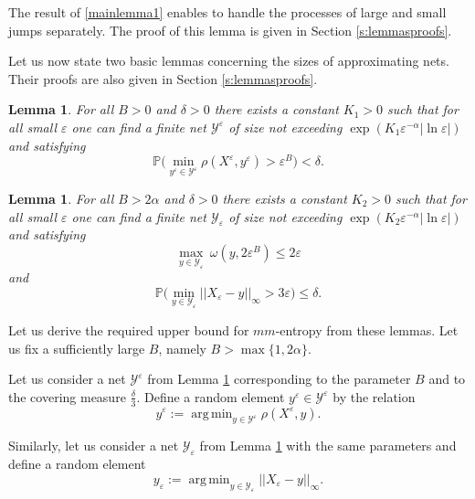 \documentclass[12pt]{article}
\let\de\delta
\let\ep\varepsilon
\newcommand{\prob}{\mathbb{P}}
\newcommand\ro{\rho}
\newcommand\YY{\mathcal Y}
\let\le\leqslant
\DeclareMathOperator*{\argmin}{arg\,min}
\newtheorem{lemma}[theorem]{Lemma}
\theoremstyle{definition}
\begin{document}
The result of \ref{mainlemma1} enables to handle the processes of large and small jumps separately. 
The proof of this lemma  is given in Section \ref{s:lemmasproofs}.

Let us now state two basic lemmas concerning the sizes of approximating nets.
Their proofs are also given in Section \ref{s:lemmasproofs}.

\begin{lemma}\label{mainlemma2}
    For all $B > 0$ and $\de > 0$ there exists a constant $K_1>0$ such that for all small $\ep$ 
    one can find a finite net $\YY^\ep$ of size not exceeding $\exp(K_1\ep^{-\alpha}|\ln \ep|)$
    and satisfying
\begin{equation} \label{lemma2_prob_bound}
            \prob\big( \min_{y^\ep\in \YY^\ep}\ro(X^\ep, y^\ep) > \ep^B\big) < \de.
\end{equation}
\end{lemma}
    
\begin{lemma}\label{mainlemma3}
    For all $B>2\alpha$ and $\de > 0$ there exists a constant $K_2 >0$ such that for all small $\ep$ 
    one can find a finite net $\YY_\ep$ of size not exceeding $\exp(K_2\ep^{-\alpha}|\ln \ep|)$ and satisfying
\begin{equation} \label{maxomega}  
       \max_{y \in \YY_\ep } \   \omega(y,2\ep^{B}) \le   2\ep
\end{equation}
and    
\begin{equation*}
            \prob\big( \min_{y\in \YY_\ep} ||X_\ep - y||_\infty > 3 \ep\big) \le \de.
\end{equation*}
\end{lemma}
\bigskip

Let us derive the required upper bound for $mm$-entropy from these lemmas.
Let us fix a sufficiently large $B$, namely $B>\max\{1,2\alpha\}$.

Let us consider a net $\YY^\ep$ from Lemma \ref{mainlemma2} corresponding to the parameter $B$ 
and to the covering measure $\frac{\de}{3}$. Define a random element $y^\ep\in\YY^\ep$ by the relation
\begin{equation*}
        y^\ep := \argmin_{y\in \YY^\ep}\ro(X^\ep, y) .
\end{equation*}

Similarly, let us consider a net $\YY_\ep$  from Lemma \ref{mainlemma3} with the same parameters
and define a random element
\begin{equation*}
        y_\ep := \argmin_{y\in \YY_\ep}  ||X_\ep - y||_\infty .
\end{equation*} 
\end{document}
